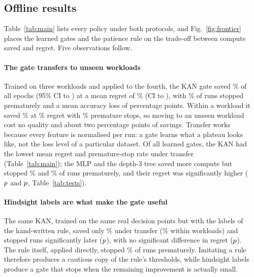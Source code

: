 \subsection*{Offline results}
Table~\ref{tab:main} lists every policy under both protocols, and Fig.~\ref{fig:frontier} places the learned gates and the patience rule on the trade-off between compute saved and regret. Five observations follow.

\paragraph{The gate transfers to unseen workloads} Trained on three workloads and applied to the fourth, the KAN gate saved \% of all epochs (95\% CI  to ) at a mean regret of \% (CI  to ), with \% of runs stopped prematurely and a mean accuracy loss of  percentage points. Within a workload it saved \% at \% regret with \% premature stops, so moving to an unseen workload cost no quality and about two percentage points of savings. Transfer works because every feature is normalised per run: a gate learns what a plateau looks like, not the loss level of a particular dataset. Of all learned gates, the KAN had the lowest mean regret and premature-stop rate under transfer (Table~\ref{tab:main}); the MLP and the depth-3 tree saved more compute but stopped \% and \% of runs prematurely, and their regret was significantly higher ($p\T{lowo}{mlp}{regret}{p}$ and $p\T{lowo}{tree}{regret}{p}$, Table~\ref{tab:tests}).

\paragraph{Hindsight labels are what make the gate useful} The same KAN, trained on the same real decision points but with the labels of the hand-written rule, saved only \% under transfer (\% within workloads) and stopped runs significantly later ($p\T{lowo}{kanrule}{stop}{p}$), with no significant difference in regret ($p\T{lowo}{kanrule}{regret}{p}$). The rule itself, applied directly, stopped \% of runs prematurely. Imitating a rule therefore produces a cautious copy of the rule's thresholds, while hindsight labels produce a gate that stops when the remaining improvement is actually small.

